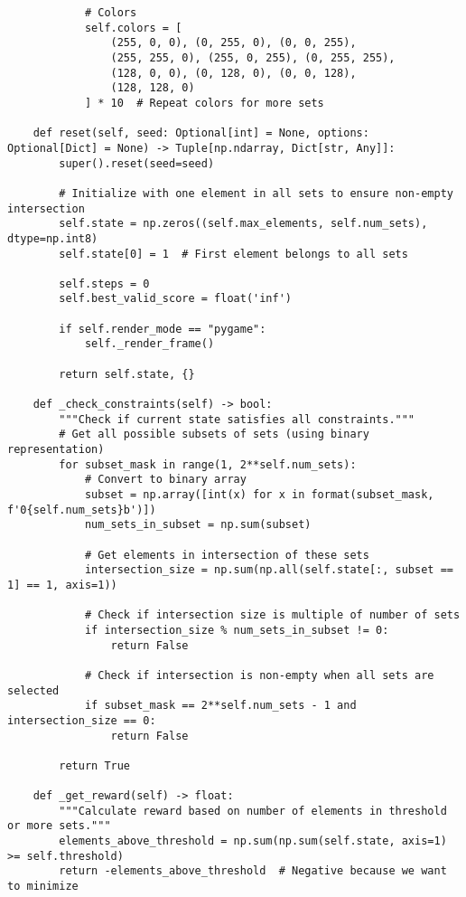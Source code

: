 \begin{lstlisting}
            # Colors
            self.colors = [
                (255, 0, 0), (0, 255, 0), (0, 0, 255),
                (255, 255, 0), (255, 0, 255), (0, 255, 255),
                (128, 0, 0), (0, 128, 0), (0, 0, 128),
                (128, 128, 0)
            ] * 10  # Repeat colors for more sets
    
    def reset(self, seed: Optional[int] = None, options: Optional[Dict] = None) -> Tuple[np.ndarray, Dict[str, Any]]:
        super().reset(seed=seed)
        
        # Initialize with one element in all sets to ensure non-empty intersection
        self.state = np.zeros((self.max_elements, self.num_sets), dtype=np.int8)
        self.state[0] = 1  # First element belongs to all sets
        
        self.steps = 0
        self.best_valid_score = float('inf')
        
        if self.render_mode == "pygame":
            self._render_frame()
        
        return self.state, {}
    
    def _check_constraints(self) -> bool:
        """Check if current state satisfies all constraints."""
        # Get all possible subsets of sets (using binary representation)
        for subset_mask in range(1, 2**self.num_sets):
            # Convert to binary array
            subset = np.array([int(x) for x in format(subset_mask, f'0{self.num_sets}b')])
            num_sets_in_subset = np.sum(subset)
            
            # Get elements in intersection of these sets
            intersection_size = np.sum(np.all(self.state[:, subset == 1] == 1, axis=1))
            
            # Check if intersection size is multiple of number of sets
            if intersection_size % num_sets_in_subset != 0:
                return False
            
            # Check if intersection is non-empty when all sets are selected
            if subset_mask == 2**self.num_sets - 1 and intersection_size == 0:
                return False
                
        return True
    
    def _get_reward(self) -> float:
        """Calculate reward based on number of elements in threshold or more sets."""
        elements_above_threshold = np.sum(np.sum(self.state, axis=1) >= self.threshold)
        return -elements_above_threshold  # Negative because we want to minimize
    

\end{lstlisting}
